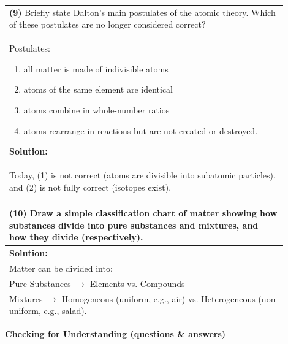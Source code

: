 \documentclass{article}
\begin{document}
\newpage
\begin{tabular}{|p{0.9\linewidth}|}
\hline
\vspace{0.2cm}

\textbf{(9)} Briefly state Dalton’s main postulates of the atomic theory. Which of these postulates are no longer considered correct? \\
Postulates:
\begin{enumerate} 
    \item all matter is made of indivisible atoms
    \item atoms of the same element are identical
    \item atoms combine in whole-number ratios
    \item atoms rearrange in reactions but are not created or destroyed. 
\end{enumerate}
\hline
\textbf{Solution:} \\
    \item Today, (1) is not correct (atoms are divisible into subatomic particles), and (2) is not fully correct (isotopes exist). \\
\hline
\end{tabular}
\newpage
\begin{tabular}{|p{0.9\linewidth}|}
\hline
\vspace{0.2cm}

\textbf{(10)} Draw a simple classification chart of matter showing how substances divide into pure substances and mixtures, and how they divide (respectively). \\
\hline
\textbf{Solution:} \\
Matter can be divided into: \\
\quad Pure Substances $\rightarrow$ Elements vs. Compounds \\
\quad Mixtures $\rightarrow$ Homogeneous (uniform, e.g., air) vs. Heterogeneous (non-uniform, e.g., salad). \\
\hline
\end{tabular}
\newpage
\noindent
{\large \textbf{Checking for Understanding (questions \& answers)}} \\
\end{document}
